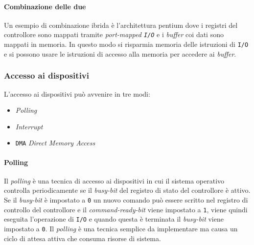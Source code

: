             \paragraph{Combinazione delle due}
                Un esempio di combinazione ibrida è l'architettura pentium dove i registri del controllore sono mappati tramite \textit{port-mapped \texttt{I/O}} e i \textit{buffer} coi dati sono mappati in memoria. In questo modo si risparmia memoria delle istruzioni di \texttt{I/O} e si possono usare le istruzioni di accesso alla memoria per accedere ai \textit{buffer}.
    \subsubsection{Accesso ai dispositivi}
        L'accesso ai dispositivi può avvenire in tre modi:
        \begin{itemize}
            \item \textit{Polling}
            \item \textit{Interrupt}
            \item \texttt{DMA} \textit{Direct Memory Access}
        \end{itemize}
        \paragraph{Polling}
            Il \textit{polling} è una tecnica di accesso ai dispositivi in cui il sistema operativo controlla periodicamente se il \textit{busy-bit} del registro di stato del controllore è attivo. Se il \textit{busy-bit} è impostato a \texttt{0} un nuovo comando può essere scritto nel registro di controllo del controllore e il \textit{command-ready-bit} viene impostato a \texttt{1}, viene quindi eseguita l'operazione di \texttt{I/O} e quando questa è terminata il \textit{busy-bit} viene impostato a \texttt{0}. Il \textit{polling} è una tecnica semplice da implementare ma causa un ciclo di attesa attiva che consuma risorse di sistema. 

